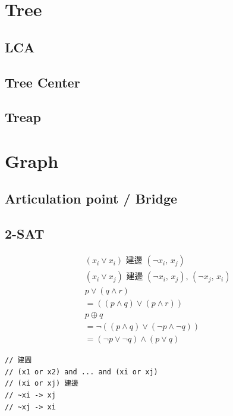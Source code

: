 \documentclass[10pt,oneside]{article}
\begin{document}
\begin{landscape}
\begin{multicols}{2}

\section{Tree}

\subsection{LCA}

\subsection{Tree Center}

\subsection{Treap}


\section{Graph}

\subsection{Articulation point / Bridge}

\subsection{2-SAT}

\begin{align*}
 &(x_i \lor x_i) \textit{ 建邊 } (\lnot x_i,\, x_j) \\
 &(x_i \lor x_j) \textit{ 建邊 } (\lnot x_i,\, x_j) ,\, (\lnot x_j,\, x_i) \\
&p \lor (q \land r)  \\
&= ((p \land q) \lor (p \land r)) \\
&p \oplus q   \\
&= \lnot ( (p \land q) \lor (\lnot p \land \lnot q))     \\
&= (\lnot p \lor \lnot q) \land (p \lor q)    
\end{align*}

\begin{verbatim}
// 建圖
// (x1 or x2) and ... and (xi or xj)
// (xi or xj) 建邊
// ~xi -> xj
// ~xj -> xi


\end{verbatim}
\end{multicols}
\end{landscape}
\end{document}

